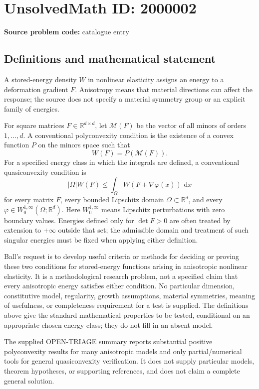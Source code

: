 \documentclass[11pt]{article}
\newcommand{\R}{\mathbb{R}}
\newcommand{\dd}{\,\mathrm{d}}
\begin{document}
\section*{UnsolvedMath ID: 2000002}
\textbf{Source problem code:} catalogue entry
\subsection{Definitions and mathematical statement}
A stored-energy density \(W\) in nonlinear elasticity assigns an energy to a deformation gradient \(F\). Anisotropy means that material directions can affect the response; the source does not specify a material symmetry group or an explicit family of energies.

For square matrices \(F\in\R^{d\times d}\), let \(\mathcal M(F)\) be the vector of all minors of orders \(1,\ldots,d\). A conventional polyconvexity condition is the existence of a convex function \(P\) on the minors space such that
\[
W(F)=P(\mathcal M(F)).
\]
For a specified energy class in which the integrals are defined, a conventional quasiconvexity condition is
\[
|\Omega|W(F)\le\int_\Omega W(F+\nabla\varphi(x))\,\dd x
\]
for every matrix \(F\), every bounded Lipschitz domain \(\Omega\subset\R^d\), and every \(\varphi\in W^{1,\infty}_0(\Omega;\R^d)\). Here \(W^{1,\infty}_0\) means Lipschitz perturbations with zero boundary values. Energies defined only for \(\det F>0\) are often treated by extension to \(+\infty\) outside that set; the admissible domain and treatment of such singular energies must be fixed when applying either definition.

Ball's request is to develop useful criteria or methods for deciding or proving these two conditions for stored-energy functions arising in anisotropic nonlinear elasticity. It is a methodological research problem, not a specified claim that every anisotropic energy satisfies either condition. No particular dimension, constitutive model, regularity, growth assumptions, material symmetries, meaning of usefulness, or completeness requirement for a test is supplied. The definitions above give the standard mathematical properties to be tested, conditional on an appropriate chosen energy class; they do not fill in an absent model.

The supplied OPEN-TRIAGE summary reports substantial positive polyconvexity results for many anisotropic models and only partial/numerical tools for general quasiconvexity verification. It does not supply particular models, theorem hypotheses, or supporting references, and does not claim a complete general solution.
\end{document}
